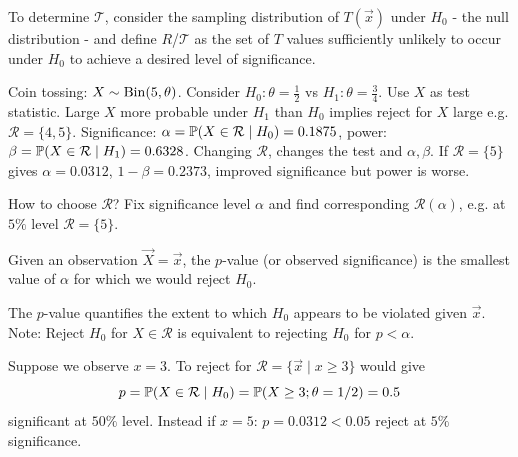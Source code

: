 \documentclass[10pt, a4paper]{article}
\begin{document}
To determine $\mathcal{T}$,
consider the sampling distribution of $T(\vec{x})$ under $H_0$ -
the null distribution -
and define $R$/$\mathcal{T}$ as the set of $T$ values sufficiently unlikely to occur under $H_0$ to achieve a desired level of significance.

\begin{example}
    Coin tossing:
    $X \sim \Bin(5, \theta)$.
    Consider $H_0 : \theta = \frac{1}{2}$ vs $H_1 : \theta = \frac{3}{4}$.
    Use $X$ as test statistic.
    Large $X$ more probable under $H_1$ than $H_0$ implies reject for $X$ large e.g. $\mathcal{R} = \{4, 5\}$.
    Significance:
    $\alpha = \P(X \in \mathcal{R}\mid H_0) = 0.1875$,
    power:
    $\beta = \P(X \in \mathcal{R} \mid H_1) = 0.6328$.
    Changing $\mathcal{R}$,
    changes the test and $\alpha, \beta$.
    If $\mathcal{R} = \{5\}$ gives $\alpha = 0.0312$,
    $1 - \beta = 0.2373$,
    improved significance but power is worse.
\end{example}

How to choose $\mathcal{R}$?
Fix significance level $\alpha$ and find corresponding $\mathcal{R}(\alpha)$,
e.g. at $5\%$ level $\mathcal{R} = \{5\}$.

\begin{definition}
    Given an observation $\vec{X} = \vec{x}$,
    the $p$-value
    (or observed significance)
    is the smallest value of $\alpha$ for which we would reject $H_0$.

    The $p$-value quantifies the extent to which $H_0$ appears to be violated given $\vec{x}$.
    Note:
    Reject $H_0$ for $X \in \mathcal{R}$ is equivalent to rejecting $H_0$ for $p < \alpha$.
\end{definition}

\begin{example}
    Suppose we observe $x = 3$.
    To reject for $\mathcal{R} = \{\vec{x} \mid x \geq 3\}$ would give
    \[
    p = \P(X \in \mathcal{R} \mid H_0) = \P(X \geq 3; \theta = 1 / 2) = 0.5
    \]
    significant at $50\%$ level.
    Instead if $x = 5$:
    $p = 0.0312 < 0.05$ reject at $5\%$ significance.
\end{example}
\end{document}
